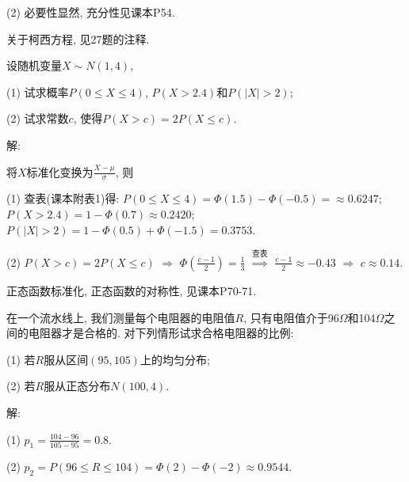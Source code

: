 \documentclass[standard]{ExBook}
\renewenvironment{shaded}{%
  \def\FrameCommand{\fboxsep=\FrameSep \colorbox{shadecolor}}%
  \MakeFramed{\advance\hsize-\width \FrameRestore}%
}{%
  \endMakeFramed
}
\begin{document}
\begin{qitems}
(2) 必要性显然, 充分性见课本P54.

\textcolor{themeColor}{\selectfont {} 关于柯西方程, 见27题的注释.}

\vspace{2.5cm-5em}

    \begin{bbox}
    \begin{shaded}
        \qitem
设随机变量$X\sim N(1,4)$,

(1) 试求概率$P(0 \leq X \leq 4)$, $P(X>2.4)$和$P(|X|>2)$;

(2) 试求常数$c$, 使得$P(X>c)=2P(X \leq c)$.
    \end{shaded}
    \end{bbox}

\vspace{\dimexpr2.5cm-5em\relax}

解: 

将$X$标准化变换为$\displaystyle\frac{X-\mu}{\sigma}$, 则

(1) 查表(课本附表1)得: $P(0\leq X\leq 4)=\Phi(1.5)-\Phi(-0.5)=\approx0.6247$; $P(X>2.4)=1-\Phi(0.7)\approx0.2420$; $P(|X|>2)=1-\Phi(0.5)+\Phi(-1.5)=0.3753$.

(2) $P(X>c)=2P(X \leq c)$ $\Longrightarrow$ $\Phi(\frac{c-1}{2})=\frac{1}{3}$ $\overset{\text{查表}}{\Longrightarrow}$ $\frac{c-1}{2}\approx-0.43$ $\Longrightarrow$ $c\approx0.14$.

\textcolor{themeColor}{\selectfont {} 正态函数标准化, 正态函数的对称性, 见课本P70-71.}

\vspace{2.5cm-5em}

    \begin{bbox}
    \begin{shaded}
        \qitem
在一个流水线上, 我们测量每个电阻器的电阻值$R$, 只有电阻值介于96$\Omega$和104$\Omega$之间的电阻器才是合格的. 对下列情形试求合格电阻器的比例:

(1) 若$R$服从区间$(95,105)$上的均匀分布;

(2) 若$R$服从正态分布$N(100,4)$.
    \end{shaded}
    \end{bbox}

\vspace{\dimexpr2.5cm-5em\relax}

解: 

(1) $p_{1}=\frac{104-96}{105-95}=0.8$.

(2) $p_{2}=P(96\leq R\leq 104)=\Phi(2)-\Phi(-2)\approx0.9544$.


\end{qitems}
\end{document}
